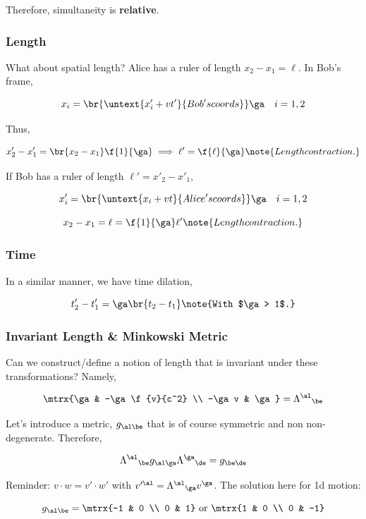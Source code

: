 \documentclass{article}
\begin{document}
Therefore, simultaneity is \textbf{relative}.

\subsubsection{Length}

What about spatial length? Alice has a ruler of length $x_2 - x_1 = \ell$. In Bob's frame,

\[ x_i = \br{\untext{x'_i + v t'}{Bob's coords}} \ga \quad i = 1,2 \]

Thus,

\[ x'_2 - x'_1 = \br{x_2 - x_1} \f{1}{\ga} \implies \ell' = \f{\ell}{\ga} \note{Length contraction.}\]

If Bob has a ruler of length $\ell' = x'_2 - x'_1$,

\[ x'_i = \br{\untext{x_i + v t}{Alice's coords}} \ga \quad i = 1,2 \]

\[ x_2 - x_1 = \ell = \f{1}{\ga}\ell'\note{Length contraction.}\]

\subsubsection{Time}

In a similar manner, we have time dilation,

\[ t'_2 - t'_1 = \ga \br{t_2 - t_1} \note{With $\ga > 1$.} \]

\subsubsection{Invariant Length \& Minkowski Metric}

Can we construct/define a notion of length that is invariant under these transformations? Namely,

\newcommand{\Lam}{\Lambda}

\[ \mtrx{\ga & -\ga \f{v}{c^2} \\ -\ga v & \ga} = {\Lam^{\al}}_{\be} \]

Let's introduce a metric, $g_{\al\be}$ that is of course symmetric and non non-degenerate. Therefore,

\[ {\Lam^{\al}}_{\be} g_{\al\ga} {\Lam^{\ga}}_{\de} = g_{\be\de}  \]

Reminder: $v \cdot w = v' \cdot w'$ with $v'^\al = {\Lam^{\al}}_{\ga} v^\ga$. The solution here for 1d motion:

\[ g_{\al\be} = \mtrx{-1 & 0 \\ 0 & 1} \text{ or } \mtrx{1 & 0 \\ 0 & -1} \]
\end{document}
